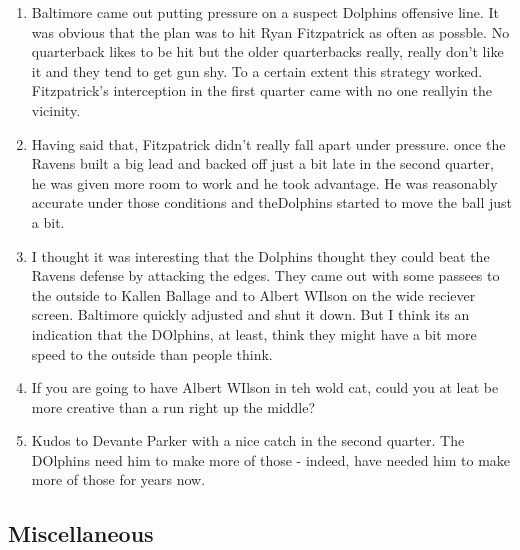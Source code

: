 \begin{enumerate}
\item Baltimore came out putting pressure on a suspect Dolphins offensive line.  It was obvious that the plan was to hit Ryan Fitzpatrick as often as possble.  No quarterback likes to be hit but the older quarterbacks really, really don't like it and they tend to get gun shy.  To a certain extent this strategy worked.  Fitzpatrick's interception in the first quarter came with no one reallyin the vicinity.
\item Having said that, Fitzpatrick didn't really fall apart under pressure.  once the Ravens built a big lead and backed off just a bit late in the second quarter, he was given more room to work and he took advantage.  He was reasonably accurate under those conditions and theDolphins started to move the ball just a bit.
\item I thought it was interesting that the Dolphins thought they could beat the Ravens defense by attacking the edges.  They came out with some passees to the outside to Kallen Ballage and to Albert WIlson on the wide reciever screen.  Baltimore quickly adjusted and shut it down.  But I think its an indication that the DOlphins, at least, think they might have a bit more speed to the outside than people think.
\item  If you are going to have Albert WIlson in teh wold cat, could you at leat be more creative than a run right up the middle?
\item Kudos to Devante Parker with a nice catch in the second quarter.  The DOlphins need him to make more of those - indeed, have needed him to make more of those for years now.
  
\end{enumerate}

\subsection*{Miscellaneous}

